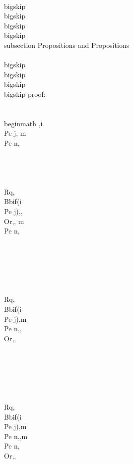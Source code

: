\\bigskip
\\bigskip
\\bigskip
\\bigskip
\\subsection{ Propositions and Propositions}
\\[,i \\Pe j, m \\Pe n, \\Rq , m \\Pe n, i \\Pe j,\\]

\\bigskip
\\bigskip
\\bigskip
\\bigskip
proof:\\\\
\\begin{math} 
,i \\Pe j, m \\Pe n, \\\\\\\\
\\Rq, \\Bb{if(i \\Pe j)}{,}{, \\Or,}, m \\Pe n, \\\\\\\\\\\\
\\Rq, \\Bb{if(i \\Pe j)}{,m \\Pe n,}{, \\Or,},  \\\\\\\\\\\\
\\Rq, \\Bb{if(i \\Pe j)}{,m \\Pe n,}{,m \\Pe n, \\Or,},  \\\\\\\\\\\\
